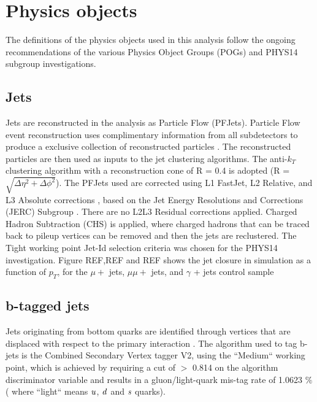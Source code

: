 \section{Physics objects}
\label{sec:objects}
The definitions of the physics objects used in this analysis follow the ongoing recommendations of the various Physics Object Groups (POGs) and PHYS14 subgroup investigations. 
\subsection{Jets}
\label{sec:jetreco}
Jets are reconstructed in the analysis as Particle Flow (PFJets). Particle Flow event reconstruction uses complimentary information from all subdetectors to produce a exclusive collection of reconstructed particles \cite{CMS-PAS-PFT-10-001}. The reconstructed particles are then used as inputs to the jet clustering algorithms. The anti-$k_{T}$ clustering algorithm with a reconstruction cone of R = 0.4 is adopted (R = $\sqrt{\Delta \eta^{2} + \Delta \phi^{2}   }$). The PFJets used are corrected using L1 FastJet, L2 Relative, and L3 Absolute corrections \cite{Jet-energy-scale}, based on the Jet Energy Resolutions and Corrections (JERC) Subgroup \cite{CMS-PAS-JME-10-003}. There are no L2L3 Residual corrections applied. Charged Hadron Subtraction (CHS) is applied, where charged hadrons that can be traced back to pileup vertices can be removed and then the jets are reclustered. 
The Tight working point Jet-Id selection criteria was chosen for the PHYS14 investigation. Figure REF,REF and REF shows the jet closure in simulation as a function of $p_{T}$, for the $\mu +$ jets, $\mu\mu +$ jets, and $\gamma$ + jets control sample

\subsection{b-tagged jets}
\label{sec:btags}
Jets originating from bottom quarks are identified through vertices that are displaced with respect to the primary interaction \cite{b-tagging}. The algorithm used to tag b-jets is the Combined Secondary Vertex tagger V2, using the ``Medium`` working point, which is achieved by requiring a cut of $>$ 0.814 on the algorithm discriminator variable and results in a gluon/light-quark mis-tag rate of 1.0623 $\%$ ( where ``light`` means $\it{u}$, $\it{d}$ and $\it{s}$ quarks).



